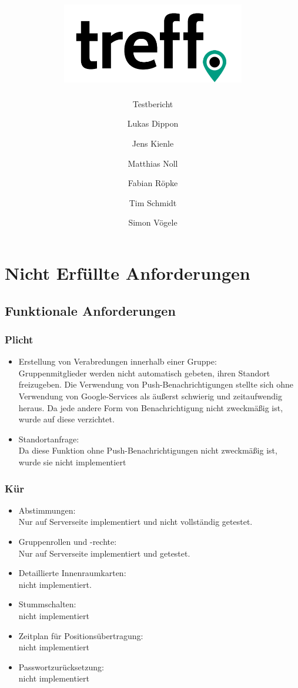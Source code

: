 \documentclass[parskip=full,11pt]{scrartcl}
\title{\includegraphics[width = 80mm]{images/logo_crop.png}}
\subtitle{\huge Testbericht}
\author{Lukas Dippon
        \and Jens Kienle
        \and Matthias Noll
        \and Fabian Röpke
        \and Tim Schmidt
        \and Simon Vögele}
\begin{document}
\maketitle
\thispagestyle{empty} %

\pagebreak
\tableofcontents

\pagebreak
\section{Nicht Erfüllte Anforderungen}
	\subsection{Funktionale Anforderungen}
		\subsubsection{Plicht}
			\begin{itemize}
				\item Erstellung von Verabredungen innerhalb einer Gruppe:\\
							\label{notification}Gruppenmitglieder werden nicht automatisch
							gebeten, ihren Standort freizugeben. Die Verwendung von
							Push-Benachrichtigungen stellte sich ohne Verwendung von
							Google-Services als äußerst schwierig und zeitaufwendig heraus.
							Da jede andere Form von Benachrichtigung nicht zweckmäßig ist,
							wurde auf diese verzichtet.
				\item Standortanfrage:\\
							\label{requestPosition}Da diese Funktion ohne
							Push-Benachrichtigungen nicht zweckmäßig ist,
							wurde sie nicht implementiert
			\end{itemize}

		\subsubsection{Kür}
			\begin{itemize}
				\item Abstimmungen:\\
							Nur auf Serverseite implementiert und nicht vollständig getestet.
				\item Gruppenrollen und -rechte:\\
							Nur auf Serverseite implementiert und getestet.
				\item Detaillierte Innenraumkarten:\\
							nicht implementiert.
				\item Stummschalten:\\
							nicht implementiert
				\item Zeitplan für Positionsübertragung:\\
							nicht implementiert
				\item Passwortzurücksetzung:\\
							nicht implementiert
			\end{itemize}
\end{document}
